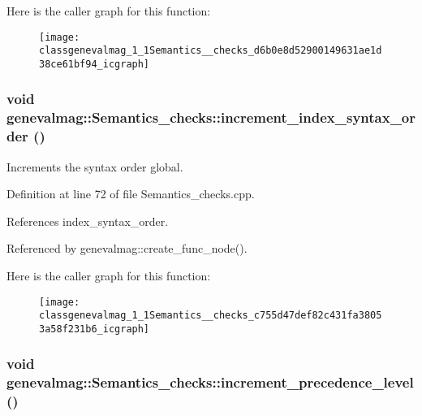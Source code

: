 Here is the caller graph for this function:\nopagebreak
\begin{figure}[H]
\begin{center}
\leavevmode
\texttt{[image: classgenevalmag\_1\_1Semantics\_\_checks\_d6b0e8d52900149631ae1d38ce61bf94\_icgraph]}
\end{center}
\end{figure}
\hypertarget{classgenevalmag_1_1Semantics__checks_c755d47def82c431fa38053a58f231b6}{
\subsubsection[{increment\_\-index\_\-syntax\_\-order}]{\setlength{\rightskip}{0pt plus 5cm}void genevalmag::Semantics\_\-checks::increment\_\-index\_\-syntax\_\-order ()}}
\label{classgenevalmag_1_1Semantics__checks_c755d47def82c431fa38053a58f231b6}


Increments the syntax order global. 

Definition at line 72 of file Semantics\_\-checks.cpp.

References index\_\-syntax\_\-order.

Referenced by genevalmag::create\_\-func\_\-node().

Here is the caller graph for this function:\nopagebreak
\begin{figure}[H]
\begin{center}
\leavevmode
\texttt{[image: classgenevalmag\_1\_1Semantics\_\_checks\_c755d47def82c431fa38053a58f231b6\_icgraph]}
\end{center}
\end{figure}
\hypertarget{classgenevalmag_1_1Semantics__checks_e9e488640f503bbd04a212f282f48826}{
\subsubsection[{increment\_\-precedence\_\-level}]{\setlength{\rightskip}{0pt plus 5cm}void genevalmag::Semantics\_\-checks::increment\_\-precedence\_\-level ()}}
\label{classgenevalmag_1_1Semantics__checks_e9e488640f503bbd04a212f282f48826}


